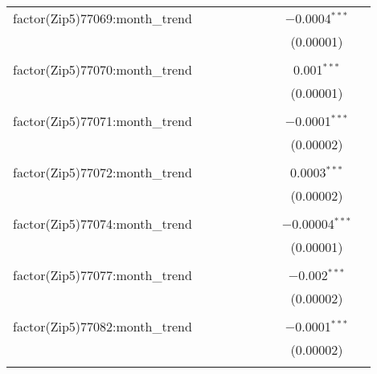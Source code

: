 \begin{table}[H]
{\begin{tabular}{@{\extracolsep{5pt}}lcccccccc}
  factor(Zip5)77069:month\_trend &  &  &  &  &  &  & $-$0.0004$^{***}$ &  \\  

   &  &  &  &  &  &  & (0.00001) &  \\  

   & & & & & & & & \\  

  factor(Zip5)77070:month\_trend &  &  &  &  &  &  & 0.001$^{***}$ &  \\  

   &  &  &  &  &  &  & (0.00001) &  \\  

   & & & & & & & & \\  

  factor(Zip5)77071:month\_trend &  &  &  &  &  &  & $-$0.0001$^{***}$ &  \\  

   &  &  &  &  &  &  & (0.00002) &  \\  

   & & & & & & & & \\  

  factor(Zip5)77072:month\_trend &  &  &  &  &  &  & 0.0003$^{***}$ &  \\  

   &  &  &  &  &  &  & (0.00002) &  \\  

   & & & & & & & & \\  

  factor(Zip5)77074:month\_trend &  &  &  &  &  &  & $-$0.00004$^{***}$ &  \\  

   &  &  &  &  &  &  & (0.00001) &  \\  

   & & & & & & & & \\  

  factor(Zip5)77077:month\_trend &  &  &  &  &  &  & $-$0.002$^{***}$ &  \\  

   &  &  &  &  &  &  & (0.00002) &  \\  

   & & & & & & & & \\  

  factor(Zip5)77082:month\_trend &  &  &  &  &  &  & $-$0.0001$^{***}$ &  \\  

   &  &  &  &  &  &  & (0.00002) &  \\  

   & & & & & & & & \\  


\end{tabular}}
\end{table}
